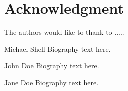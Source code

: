 \documentclass[journal]{IEEEtran}
\begin{document}
\section*{Acknowledgment}

The authors would like to thank to .....

\ifCLASSOPTIONcaptionsoff
  \newpage
\fi

\printbibliography[title=References,category=cited]

\vspace{12pt}

\newpage
\nocite{*}
\printbibliography[title={To Be Cited},resetnumbers=true,notcategory=cited]

\begin{IEEEbiography}{Michael Shell}
Biography text here.
\end{IEEEbiography}

\begin{IEEEbiographynophoto}{John Doe}
Biography text here.
\end{IEEEbiographynophoto}

\begin{IEEEbiographynophoto}{Jane Doe}
Biography text here.
\end{IEEEbiographynophoto}
\end{document}
